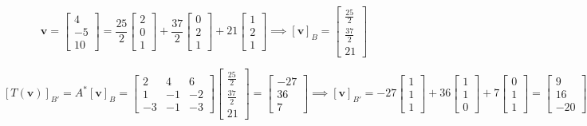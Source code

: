 \documentclass{report}
\begin{document}
$$
\bm{v} = \begin{bmatrix} 4 \\ -5 \\ 10 \end{bmatrix} = \frac{25}{2} \begin{bmatrix} 2 \\ 0 \\ 1 \end{bmatrix} + \frac{37}{2} \begin{bmatrix} 0 \\ 2 \\ 1 \end{bmatrix} + 21 \begin{bmatrix} 1 \\ 2 \\ 1 \end{bmatrix} \implies [\bm{v}]_{B} = \begin{bmatrix} \frac{25}{2} \\ \frac{37}{2} \\ 21 \end{bmatrix}
$$

$$
[T(\bm{v})]_{B'} = A^{*} [\bm{v}]_{B} = \begin{bmatrix} 2 & 4 & 6 \\ 1 & -1 & -2 \\ -3 & -1 & -3 \end{bmatrix} \begin{bmatrix} \frac{25}{2} \\ \frac{37}{2} \\ 21 \end{bmatrix} = \begin{bmatrix} -27 \\ 36 \\ 7 \end{bmatrix} \implies [\bm{v}]_{B'} = -27 \begin{bmatrix} 1 \\ 1 \\ 1 \end{bmatrix}+ 36 \begin{bmatrix} 1 \\ 1 \\ 0 \end{bmatrix}+ 7 \begin{bmatrix} 0 \\ 1 \\ 1 \end{bmatrix}= \begin{bmatrix} 9 \\ 16 \\ -20 \end{bmatrix}
$$
\end{document}
